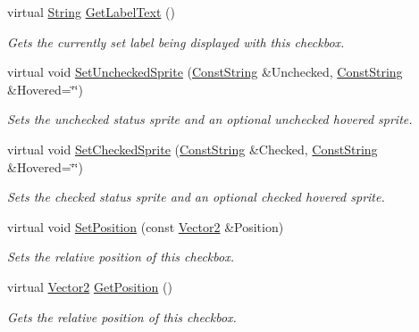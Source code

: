 \begin{DoxyCompactItemize}
virtual \hyperlink{namespacephys_aa03900411993de7fbfec4789bc1d392e}{String} \hyperlink{classphys_1_1UI_1_1CheckBox_a19078efa52e8b2c133f3b5229b8742eb}{GetLabelText} ()
\begin{DoxyCompactList}\small\item\em Gets the currently set label being displayed with this checkbox. \item\end{DoxyCompactList}\item 
virtual void \hyperlink{classphys_1_1UI_1_1CheckBox_ab4b6304f4203a244dea48185eff81f43}{SetUncheckedSprite} (\hyperlink{namespacephys_a5ce5049f8b4bf88d6413c47b504ebb31}{ConstString} \&Unchecked, \hyperlink{namespacephys_a5ce5049f8b4bf88d6413c47b504ebb31}{ConstString} \&Hovered=\char`\"{}\char`\"{})
\begin{DoxyCompactList}\small\item\em Sets the unchecked status sprite and an optional unchecked hovered sprite. \item\end{DoxyCompactList}\item 
virtual void \hyperlink{classphys_1_1UI_1_1CheckBox_a283705ddaab86875a3a025d34f53bec1}{SetCheckedSprite} (\hyperlink{namespacephys_a5ce5049f8b4bf88d6413c47b504ebb31}{ConstString} \&Checked, \hyperlink{namespacephys_a5ce5049f8b4bf88d6413c47b504ebb31}{ConstString} \&Hovered=\char`\"{}\char`\"{})
\begin{DoxyCompactList}\small\item\em Sets the checked status sprite and an optional checked hovered sprite. \item\end{DoxyCompactList}\item 
virtual void \hyperlink{classphys_1_1UI_1_1CheckBox_ae0a000643e0f96f12d754a8e1e5dd04b}{SetPosition} (const \hyperlink{classphys_1_1Vector2}{Vector2} \&Position)
\begin{DoxyCompactList}\small\item\em Sets the relative position of this checkbox. \item\end{DoxyCompactList}\item 
virtual \hyperlink{classphys_1_1Vector2}{Vector2} \hyperlink{classphys_1_1UI_1_1CheckBox_a8a8630b27ab769b6e42657c5388ec7fe}{GetPosition} ()
\begin{DoxyCompactList}\small\item\em Gets the relative position of this checkbox. \item\end{DoxyCompactList}\item 

\end{DoxyCompactItemize}
